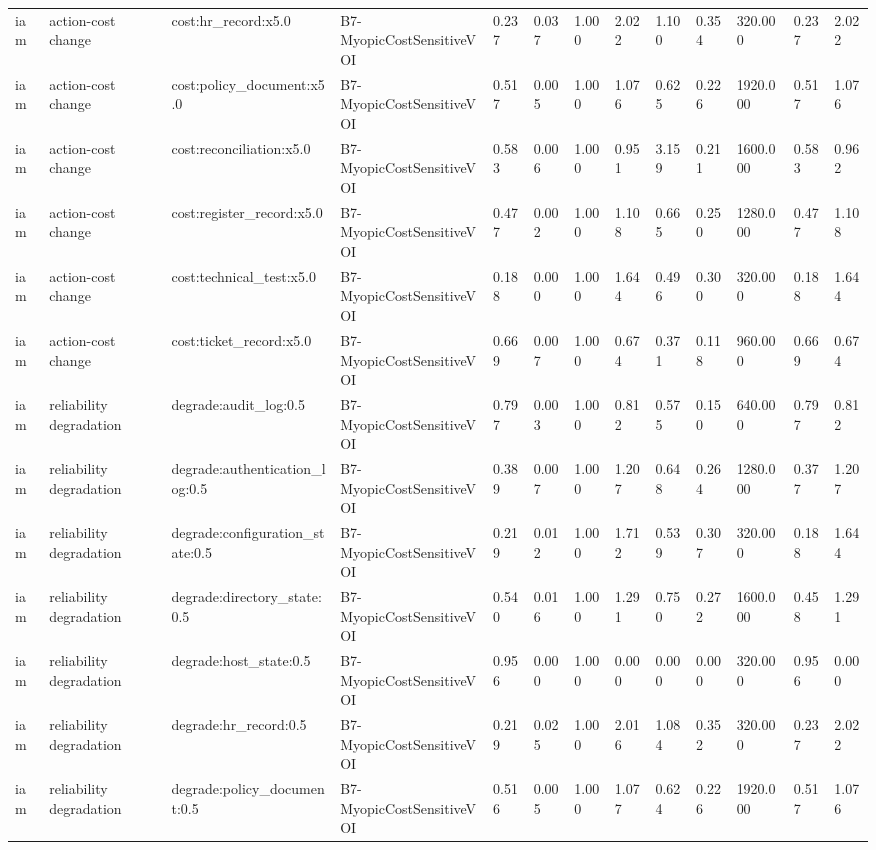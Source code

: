 \begin{table}[!ht]
{\begin{tabular}{lllllllllllll}
iam & action-cost change & cost:hr\_record:x5.0 & B7-MyopicCostSensitiveVOI & 0.237 & 0.037 & 1.000 & 2.022 & 1.100 & 0.354 & 320.000 & 0.237 & 2.022 \\
iam & action-cost change & cost:policy\_document:x5.0 & B7-MyopicCostSensitiveVOI & 0.517 & 0.005 & 1.000 & 1.076 & 0.625 & 0.226 & 1920.000 & 0.517 & 1.076 \\
iam & action-cost change & cost:reconciliation:x5.0 & B7-MyopicCostSensitiveVOI & 0.583 & 0.006 & 1.000 & 0.951 & 3.159 & 0.211 & 1600.000 & 0.583 & 0.962 \\
iam & action-cost change & cost:register\_record:x5.0 & B7-MyopicCostSensitiveVOI & 0.477 & 0.002 & 1.000 & 1.108 & 0.665 & 0.250 & 1280.000 & 0.477 & 1.108 \\
iam & action-cost change & cost:technical\_test:x5.0 & B7-MyopicCostSensitiveVOI & 0.188 & 0.000 & 1.000 & 1.644 & 0.496 & 0.300 & 320.000 & 0.188 & 1.644 \\
iam & action-cost change & cost:ticket\_record:x5.0 & B7-MyopicCostSensitiveVOI & 0.669 & 0.007 & 1.000 & 0.674 & 0.371 & 0.118 & 960.000 & 0.669 & 0.674 \\
iam & reliability degradation & degrade:audit\_log:0.5 & B7-MyopicCostSensitiveVOI & 0.797 & 0.003 & 1.000 & 0.812 & 0.575 & 0.150 & 640.000 & 0.797 & 0.812 \\
iam & reliability degradation & degrade:authentication\_log:0.5 & B7-MyopicCostSensitiveVOI & 0.389 & 0.007 & 1.000 & 1.207 & 0.648 & 0.264 & 1280.000 & 0.377 & 1.207 \\
iam & reliability degradation & degrade:configuration\_state:0.5 & B7-MyopicCostSensitiveVOI & 0.219 & 0.012 & 1.000 & 1.712 & 0.539 & 0.307 & 320.000 & 0.188 & 1.644 \\
iam & reliability degradation & degrade:directory\_state:0.5 & B7-MyopicCostSensitiveVOI & 0.540 & 0.016 & 1.000 & 1.291 & 0.750 & 0.272 & 1600.000 & 0.458 & 1.291 \\
iam & reliability degradation & degrade:host\_state:0.5 & B7-MyopicCostSensitiveVOI & 0.956 & 0.000 & 1.000 & 0.000 & 0.000 & 0.000 & 320.000 & 0.956 & 0.000 \\
iam & reliability degradation & degrade:hr\_record:0.5 & B7-MyopicCostSensitiveVOI & 0.219 & 0.025 & 1.000 & 2.016 & 1.084 & 0.352 & 320.000 & 0.237 & 2.022 \\
iam & reliability degradation & degrade:policy\_document:0.5 & B7-MyopicCostSensitiveVOI & 0.516 & 0.005 & 1.000 & 1.077 & 0.624 & 0.226 & 1920.000 & 0.517 & 1.076 \\

\end{tabular}}
\end{table}
